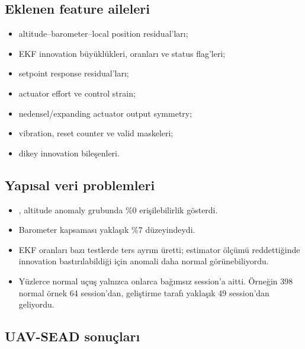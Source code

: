 \documentclass[11pt,a4paper,oneside]{report}
\newcommand{\code}[1]{\texttt{\detokenize{#1}}}
\begin{document}
\subsection{Eklenen feature aileleri}

\begin{itemize}
  \item altitude--barometer--local position residual'ları;
  \item EKF innovation büyüklükleri, oranları ve status flag'leri;
  \item setpoint response residual'ları;
  \item actuator effort ve control strain;
  \item nedensel/expanding actuator output symmetry;
  \item vibration, reset counter ve valid maskeleri;
  \item dikey innovation bileşenleri.
\end{itemize}

\subsection{Yapısal veri problemleri}

\begin{itemize}
  \item \code{alt_local_residual}, altitude anomaly grubunda \(\%0\)
  erişilebilirlik gösterdi.
  \item Barometer kapsaması yaklaşık \(\%7\) düzeyindeydi.
  \item EKF oranları bazı testlerde ters ayrım üretti; estimator ölçümü
  reddettiğinde innovation bastırılabildiği için anomali daha normal
  görünebiliyordu.
  \item Yüzlerce normal uçuş yalnızca onlarca bağımsız session'a aitti.
  Örneğin 398 normal örnek 64 session'dan, geliştirme tarafı yaklaşık 49
  session'dan geliyordu.
\end{itemize}

\subsection{UAV-SEAD sonuçları}
\end{document}
